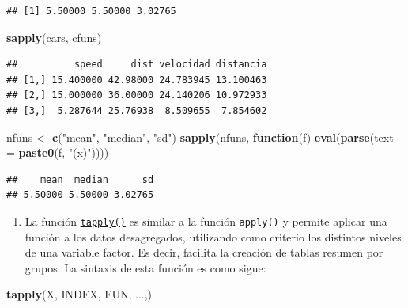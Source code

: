 \documentclass[
]{book}
\newenvironment{Shaded}{\begin{snugshade}}{\end{snugshade}}
\newcommand{\AttributeTok}[1]{\textcolor[rgb]{0.13,0.29,0.53}{#1}}
\newcommand{\ControlFlowTok}[1]{\textcolor[rgb]{0.13,0.29,0.53}{\textbf{#1}}}
\newcommand{\FunctionTok}[1]{\textcolor[rgb]{0.13,0.29,0.53}{\textbf{#1}}}
\newcommand{\NormalTok}[1]{#1}
\newcommand{\OtherTok}[1]{\textcolor[rgb]{0.56,0.35,0.01}{#1}}
\newcommand{\StringTok}[1]{\textcolor[rgb]{0.31,0.60,0.02}{#1}}
\providecommand{\tightlist}{%
  \setlength{\itemsep}{0pt}\setlength{\parskip}{0pt}}
\theoremstyle{break}
\theoremstyle{nonumberplain}
\begin{document}
\begin{verbatim}
## [1] 5.50000 5.50000 3.02765
\end{verbatim}

\begin{Shaded}
\begin{Highlighting}[]
\FunctionTok{sapply}\NormalTok{(cars, cfuns)}
\end{Highlighting}
\end{Shaded}

\begin{verbatim}
##          speed     dist velocidad distancia
## [1,] 15.400000 42.98000 24.783945 13.100463
## [2,] 15.000000 36.00000 24.140206 10.972933
## [3,]  5.287644 25.76938  8.509655  7.854602
\end{verbatim}

\begin{Shaded}
\begin{Highlighting}[]
\NormalTok{nfuns }\OtherTok{\textless{}{-}} \FunctionTok{c}\NormalTok{(}\StringTok{"mean"}\NormalTok{, }\StringTok{"median"}\NormalTok{, }\StringTok{"sd"}\NormalTok{)}
\FunctionTok{sapply}\NormalTok{(nfuns, }
       \ControlFlowTok{function}\NormalTok{(f) }\FunctionTok{eval}\NormalTok{(}\FunctionTok{parse}\NormalTok{(}\AttributeTok{text =} \FunctionTok{paste0}\NormalTok{(f, }\StringTok{"(x)"}\NormalTok{))))}
\end{Highlighting}
\end{Shaded}

\begin{verbatim}
##    mean  median      sd 
## 5.50000 5.50000 3.02765
\end{verbatim}

\begin{enumerate}
\def\labelenumi{\alph{enumi}.}
\setcounter{enumi}{2}
\tightlist
\item
  La función \href{https://www.rdocumentation.org/packages/base/versions/3.6.1/topics/tapply}{\texttt{tapply()}} es
  similar a la función \texttt{apply()} y permite aplicar una función a los datos desagregados,
  utilizando como criterio los distintos niveles de una variable factor. Es decir,
  facilita la creación de tablas resumen por grupos. La sintaxis de esta función es como sigue:
\end{enumerate}

\begin{Shaded}
\begin{Highlighting}[]
    \FunctionTok{tapply}\NormalTok{(X, INDEX, FUN, ...,)}
\end{Highlighting}
\end{Shaded}
\end{document}
